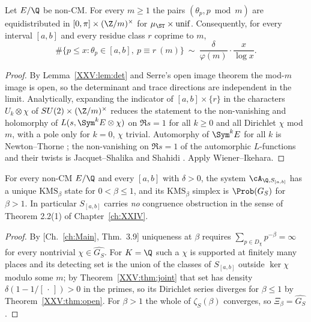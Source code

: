 \begin{theorem}\label{XXV:thm:joint}
Let $E/\Q$ be non-CM. For every $m\ge1$ the pairs $(\theta_p,p\bmod m)$ are equidistributed
in $[0,\pi]\times(\Z/m)^\times$ for $\mu_\ST\times\mathrm{unif}$. Consequently, for every
interval $[a,b]$ and every residue class $r$ coprime to $m$,
\[
\#\bigl\{p\le x:\theta_p\in[a,b],\ p\equiv r\ (m)\bigr\}\ \sim\ \frac{\delta}{\varphi(m)}\cdot\frac{x}{\log x}.
\]
\end{theorem}

\begin{proof}
By Lemma~\ref{XXV:lem:det} and Serre's open image theorem \cite{Serre} the mod-$m$ image is open, so the
determinant and trace directions are independent in the limit. Analytically, expanding the
indicator of $[a,b]\times\{r\}$ in the characters $U_k\otimes\chi$ of
$SU(2)\times(\Z/m)^\times$ reduces the statement to the non-vanishing and holomorphy of
$L(s,\Sym^kE\otimes\chi)$ on $\Re s=1$ for all $k\ge0$ and all Dirichlet $\chi$ mod $m$,
with a pole only for $k=0$, $\chi$ trivial. Automorphy of $\Sym^kE$ for all $k$ is
Newton--Thorne \cite{NT}; the non-vanishing on $\Re s=1$ of the automorphic $L$-functions and their
twists is Jacquet--Shalika \cite{JS} and Shahidi \cite{Shahidi}. Apply Wiener--Ikehara.
\end{proof}

\begin{theorem}\label{XXV:thm:unique}
For every non-CM $E/\Q$ and every $[a,b]$ with $\delta>0$, the system
$\cA_{\Q,S_{[a,b]}}$ has a unique $\mathrm{KMS}_\beta$ state for $0<\beta\le1$, and its
$\mathrm{KMS}_\beta$ simplex is $\Prob(G_S)$ for $\beta>1$. In particular $S_{[a,b]}$ carries
\emph{no} congruence obstruction in the sense of Theorem 2.2(1) of Chapter~\ref{ch:XXIV}.
\end{theorem}

\begin{proof}
By [Ch.~\ref{ch:Main}, Thm.~3.9] uniqueness at $\beta$ requires
$\sum_{p\in D_\chi}p^{-\beta}=\infty$ for every nontrivial $\chi\in\widehat{G_S}$. For
$K=\Q$ such a $\chi$ is supported at finitely many places and its detecting set is the union
of the classes of $S_{[a,b]}$ outside $\ker\chi$ modulo some $m$; by
Theorem~\ref{XXV:thm:joint} that set has density $\delta(1-1/[\,\cdot\,])>0$ in the primes, so
its Dirichlet series diverges for $\beta\le1$ by Theorem~\ref{XXV:thm:open}. For $\beta>1$ the
whole of $\zeta_S(\beta)$ converges, so $\Xi_\beta=\widehat{G_S}$.
\end{proof}

